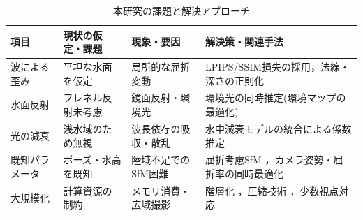 \begin{table}[htbp]
  \centering
  \caption{本研究の課題と解決アプローチ}
  \label{tab:challenges-and-solutions}
  \small
  \renewcommand{\arraystretch}{1.4}
  \setlength{\tabcolsep}{0.65em}
  \begin{tabularx}{\textwidth}{@{} l >{\RaggedRight}p{2.4cm} >{\RaggedRight}p{2.6cm} >{\RaggedRight}X @{}}
  \toprule
  \textbf{項目} & \textbf{現状の仮定・課題} & \textbf{現象・要因} & \textbf{解決策・関連手法} \\
  \midrule
  波による歪み & 平坦な水面を仮定 & 局所的な屈折変動 &
  LPIPS/SSIM損失の採用，法線・深さの正則化 \cite{Huang2024SIGGRAPH_2DGS, Gu2024CVPR_SuGaR} \\
  \addlinespace[0.25em]
  水面反射 & フレネル反射未考慮 & 鏡面反射・環境光 &
  環境光の同時推定(環境マップの最適化) \cite{Jiang2024CVPR_GaussianShader, Ye2024SIGGRAPH_DeferredReflection} \\
  \addlinespace[0.25em]
  光の減衰 & 浅水域のため無視 & 波長依存の吸収・散乱 &
  水中減衰モデルの統合による係数推定 \cite{Yang2025ICRA_SeaSplat, li20243DV_watersplatting,Akkaynak2019CVPR_Sea-Thru} \\
  \addlinespace[0.25em]
  既知パラメータ & ポーズ・水高を既知 & 陸域不足でのSfM困難 &
  屈折考慮SfM \cite{Makris2024_refractive-aware-sfm}，カメラ姿勢・屈折率の同時最適化 \\
  \addlinespace[0.25em]
  大規模化 & 計算資源の制約 & メモリ消費・広域撮影 &
  階層化 \cite{Kerbl2024ToG_Hierarchical3DGS}，圧縮技術 \cite{Lee2024CVPR_Compact3DGS}，少数視点対応 \cite{Guedon2025CVPR_MatChaGaussians} \\
  \bottomrule
  \end{tabularx}
\end{table}